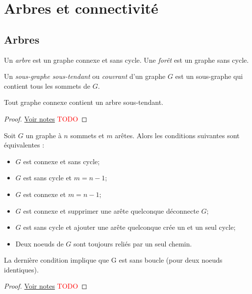 \section{Arbres et connectivité}
\subsection{Arbres}
\begin{mydef}
  Un \emph{arbre} est un graphe connexe et sans cycle. Une \emph{forêt} est un graphe sans cycle.
\end{mydef}

\begin{mydef}
  Un \emph{sous-graphe sous-tendant} ou \emph{couvrant} d’un graphe $G$ est un sous-graphe qui contient tous les sommets de $G$.
\end{mydef}

\begin{mytheo}   
  Tout graphe connexe contient un arbre sous-tendant.
  \begin{proof}
     \href{https://dl.dropboxusercontent.com/u/44092863/Graph_Theory_Romain_Capron.pdf}{Voir notes} \textcolor{red}{TODO}
  \end{proof}
\end{mytheo}

\begin{mytheo} 
  Soit $G$ un graphe à $n$ sommets et $m$ arêtes. Alors les conditions suivantes sont équivalentes :
  \begin{itemize}
    \item $G$ est connexe et sans cycle;
    \item $G$ est sans cycle et $m = n − 1$;
    \item $G$ est connexe et $m = n − 1$;
    \item $G$ est connexe et supprimer une arête quelconque déconnecte $G$;
    \item $G$ est sans cycle et ajouter une arête quelconque crée un et un seul cycle;
    \item Deux noeuds de $G$ sont toujours reliés par un seul chemin.
  \end{itemize}
  La dernière condition implique que G est sans boucle (pour deux noeuds identiques).
  \begin{proof}
     \href{https://dl.dropboxusercontent.com/u/44092863/Graph_Theory_Romain_Capron.pdf}{Voir notes} \textcolor{red}{TODO}
  \end{proof}
\end{mytheo}

